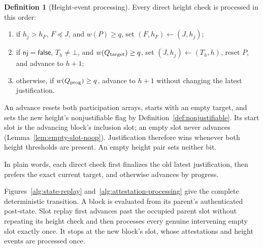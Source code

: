\ifx\litemode\undefined\documentclass{article}\fi
\theoremstyle{plain}
\theoremstyle{definition}
\newtheorem{definition}{Definition}
\theoremstyle{remark}
\newcommand{\nj}{\mathsf{nj}}
\begin{document}
\begin{definition}[Height-event processing]\label{def:height-outcome}
Every direct height check is processed in this order:
\begin{enumerate}
 \item if \(h_j>h_F\), \(F\preceq J\), and \(w(P)\geq q\), set
   \((F,h_F)\gets(J,h_j)\);
 \item if \(\nj=\mathsf{false}\), \(T_h\neq\bot\), and
   \(w(Q_{\rm target})\geq q\), set
   \((J,h_j)\gets(T_h,h)\), reset \(P\), and advance to \(h+1\);
 \item otherwise, if \(w(Q_{\rm prog})\geq q\), advance to \(h+1\)
   without changing the latest justification.
\end{enumerate}
An advance resets both participation arrays, starts with an empty target, and
sets the new height's nonjustifiable flag by
Definition~\ref{def:nonjustifiable}.  Its start slot is the advancing block's
inclusion slot; an empty slot never advances
(Lemma~\ref{lem:empty-slot-noop}).
Justification therefore wins whenever both height thresholds are present.
An empty height pair sets neither bit.

In plain words, each direct check first finalizes the old latest
justification, then prefers the exact current target, and otherwise advances
by progress.
\end{definition}

Figures~\ref{alg:state-replay} and~\ref{alg:attestation-processing} give the
complete deterministic transition.  A block is evaluated from its parent's
authenticated post-state.  Slot replay first advances past the occupied
parent slot without repeating its height check and then processes every
genuine intervening empty slot exactly once.  It stops at the new block's
slot, whose attestations and height events are processed once.
\end{document}
